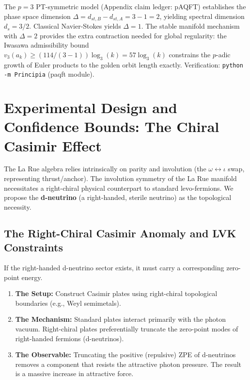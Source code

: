 \begin{remark}
The $p=3$ PT-symmetric model (Appendix claim ledger: pAQFT) establishes the phase space dimension $\Delta = d_{st,B} - d_{st,A} = 3 - 1 = 2$, yielding spectral dimension $d_s = 3/2$.  Classical Navier-Stokes yields $\Delta = 1$.  The stable manifold mechanism with $\Delta = 2$ provides the extra contraction needed for global regularity: the Iwasawa admissibility bound $v_3(a_k) \geq (114/(3-1)) \log_3(k) = 57 \log_3(k)$ constrains the $p$-adic growth of Euler products to the golden orbit length exactly.  Verification: \texttt{python -m Principia} (paqft module).
\end{remark}

\section{Experimental Design and Confidence Bounds: The Chiral Casimir Effect}\label{sec:experiment}

The La Rue algebra relies intrinsically on parity and involution (the $\omega \leftrightarrow \iota$ swap, representing thrust/anchor). The involution symmetry of the La Rue manifold necessitates a right-chiral physical counterpart to standard levo-fermions. We propose the \textbf{d-neutrino} (a right-handed, sterile neutrino) as the topological necessity.

\subsection{The Right-Chiral Casimir Anomaly and LVK Constraints}\label{sec:chiral}

If the right-handed d-neutrino sector exists, it must carry a corresponding zero-point energy.
\begin{enumerate}
    \item \textbf{The Setup:} Construct Casimir plates using right-chiral topological boundaries (e.g., Weyl semimetals).
    \item \textbf{The Mechanism:} Standard plates interact primarily with the photon vacuum. Right-chiral plates preferentially truncate the zero-point modes of right-handed fermions (d-neutrinos).
    \item \textbf{The Observable:} Truncating the positive (repulsive) ZPE of d-neutrinos removes a component that resists the attractive photon pressure. The result is a massive increase in attractive force.
\end{enumerate}


